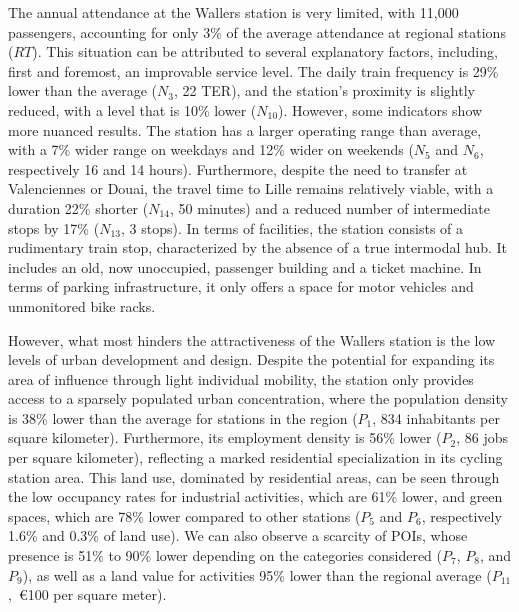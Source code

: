 \begin{refsegment}
The annual attendance at the Wallers station is very limited, with 11,000 passengers, accounting for only 3\% of the average attendance at regional stations (\(RT\)). This situation can be attributed to several explanatory factors, including, first and foremost, an improvable service level. The daily train frequency is 29\% lower than the average (\(N_{3}\), 22 \acrshort{TER}), and the station's proximity is slightly reduced, with a level that is 10\% lower (\(N_{10}\)). However, some indicators show more nuanced results. The station has a larger operating range than average, with a 7\% wider range on weekdays and 12\% wider on weekends (\(N_{5}\) and \(N_{6}\), respectively 16 and 14 hours). Furthermore, despite the need to transfer at Valenciennes or Douai, the travel time to Lille remains relatively viable, with a duration 22\% shorter (\(N_{14}\), 50 minutes) and a reduced number of intermediate stops by 17\% (\(N_{13}\), 3 stops). In terms of facilities, the station consists of a rudimentary train stop, characterized by the absence of a true intermodal hub. It includes an old, now unoccupied, passenger building and a ticket machine. In terms of parking infrastructure, it only offers a space for motor vehicles and unmonitored bike racks.%

However, what most hinders the attractiveness of the Wallers station is the low levels of urban development and design. Despite the potential for expanding its area of influence through light individual mobility, the station only provides access to a sparsely populated urban concentration, where the population density is 38\% lower than the average for stations in the region (\(P_{1}\), 834 inhabitants per square kilometer). Furthermore, its employment density is 56\% lower (\(P_{2}\), 86 jobs per square kilometer), reflecting a marked residential specialization in its cycling station area. This land use, dominated by residential areas, can be seen through the low occupancy rates for industrial activities, which are 61\% lower, and green spaces, which are 78\% lower compared to other stations (\(P_{5}\) and \(P_{6}\), respectively 1.6\% and 0.3\% of land use). We can also observe a scarcity of \acrshort{POIs}, whose presence is 51\% to 90\% lower depending on the categories considered (\(P_{7}\), \(P_{8}\), and \(P_{9}\)), as well as a land value for activities 95\% lower than the regional average (\(P_{11}\),~\euro100 per square meter).%


\end{refsegment}
